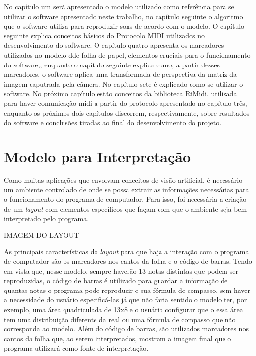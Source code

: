 \documentclass[12pt]{report}
\begin{document}
No capítulo um será apresentado o modelo utilizado como referência para se utilizar o software apresentado neste trabalho, no capítulo seguinte o algoritmo que o software utiliza para reproduzir sons de acordo com o modelo. O capítulo seguinte explica conceitos básicos do Protocolo MIDI utilizados no desenvolvimento do software. O capítulo quatro apresenta os marcadores utilizados no modelo dde folha de papel, elementos cruciais para o funcionamento do software,, enquanto o capítulo seguinte explica como, a partir desses marcadores, o software aplica uma transformada de perspectiva da matriz da imagem caputrada pela câmera. No capítulo sete é explicado como se utilizar o software. No próximo capítulo estão conceitos da biblioteca RtMidi, utilizada para haver comunicação midi a partir do protocolo apresentado no capítulo três, enquanto os próximos dois capítulos discorrem, respectivamente, sobre resultados do software e conclusões tiradas ao final do desenvolvimento do projeto.

\chapter{Modelo para Interpretação}
\label{cha:cha1}

Como muitas aplicações que envolvam conceitos de visão artificial, é necessário um ambiente controlado de onde se possa extrair as informações necessárias para o funcionamento do programa de computador. Para isso, foi necessária a criação de um {\it layout} com elementos específicos que façam com que o ambiente seja bem interpretado pelo programa.

IMAGEM DO LAYOUT

As principais características do {\it layout} para que haja a interação com o programa de computador são os  marcadores nos cantos da folha e o código de barras. Tendo em vista que, nesse modelo, sempre haverão 13 notas distintas que podem ser reproduzidas, o código de barras é utilizado para guardar a informação de quantas notas o programa pode reproduzir e sua fórmula de compasso, sem haver a necessidade do usuário especificá-las já que não faria sentido o modelo ter, por exemplo, uma área quadriculada de 13x8 e o usuário configurar que o essa área tem uma distribuição diferente da real ou uma fórmula de compasso que não corresponda ao modelo. Além do código de barras, são utilizados marcadores nos cantos da folha que, ao serem interpretados, mostram a imagem final que o programa utilizará como fonte de interpretação.
\end{document}
